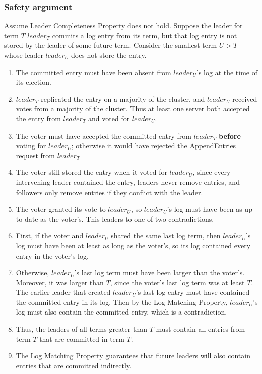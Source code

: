 \documentclass[11pt]{article}
\begin{document}
\subsubsection{Safety argument}
\label{sec:org2c57b12}
\label{3.3}
Assume Leader Completeness Property does not hold. Suppose the leader for term \(T\) \(leader_T\)
commits a log entry from its term, but that log entry is not stored by the leader of some future term.
Consider the smallest term \(U>T\) whose leader \(leader_U\) does not store the entry.
\begin{enumerate}
\item The committed entry must have been absent from \(leader_U\)'s log at the time of its election.
\item \(leader_T\) replicated the entry on a majority of the cluster, and \(leader_U\) received votes
from a majority of the cluster. Thus at least one server both accepted the entry from \(leader_T\)
and voted for \(leader_U\).
\item The voter must have accepted the committed entry from \(leader_T\) \textbf{before} voting for \(leader_U\);
otherwise it would have rejected the AppendEntries request from \(leader_T\)
\item The voter still stored the entry when it voted for \(leader_U\), since every intervening leader
contained the entry, leaders never remove entries, and followers only remove entries if they
conflict with the leader.
\item The voter granted its vote to \(leader_U\), so \(leader_U\)'s log must have been as up-to-date as
the voter's. This leaders to one of two contradictions.
\item First, if the voter and \(leader_U\) shared the same last log term, then \(leader_U\)'s log must
have been at least as long as the voter's, so its log contained every entry in the voter's log.
\item Otherwise, \(leader_U\)'s last log term must have been larger than the voter's. Moreover, it was
larger than \(T\), since the voter's last log term was at least \(T\). The earlier leader that
created \(leader_U\)'s last log entry must have contained the committed entry in its log. Then by
the Log Matching Property, \(leader_U\)'s log must also contain the committed entry, which is a contradiction.
\item Thus, the leaders of all terms greater than \(T\) must contain all entries from term \(T\) that are
committed in term \(T\).
\item The Log Matching Property guarantees that future leaders will also contain entries that are
committed indirectly.
\end{enumerate}
\end{document}
